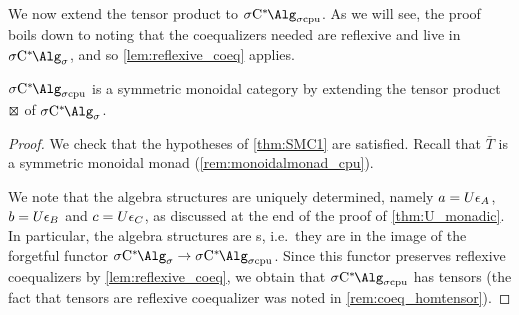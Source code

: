 We now extend the tensor product to $\SigmaCcpu$.
As we will see, the proof boils down to noting that the coequalizers needed are reflexive and live in $\SigmaC$, and so \cref{lem:reflexive_coeq} applies.
\begin{theorem}\label{thm:tensor_scpu}
	$\SigmaCcpu$ is a symmetric monoidal category by extending the tensor product $\kocktensor$ of $\SigmaC$.
\end{theorem}
\begin{proof}
	We check that the hypotheses of \cref{thm:SMC1} are satisfied. Recall that $\bar{T}$ is a symmetric monoidal monad (\cref{rem:monoidalmonad_cpu}).

	We note that the algebra structures are uniquely determined, namely $a=U\epsilon_{{A}}$, $b=U\epsilon_{{B}}$ and $c=U\epsilon_{{C}}$, as discussed at the end of the proof of \cref{thm:U_monadic}.
	In particular, the algebra structures are \starshom{}s, i.e.~they are in the image of the forgetful functor $\SigmaC\to \SigmaCcpu$.
	Since this functor preserves reflexive coequalizers by \cref{lem:reflexive_coeq}, we obtain that $\SigmaCcpu$ has tensors (the fact that tensors are reflexive coequalizer was noted in \cref{rem:coeq_homtensor}).


\end{proof}
